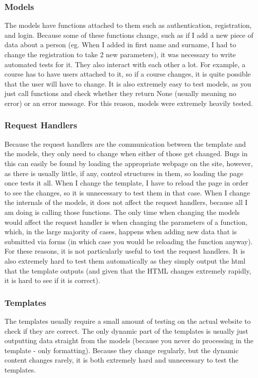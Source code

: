 \subsubsection{Models}
The models have functions attached to them such as authentication, registration, and login. Because some of these functions change, such as if I add a new piece of data about a person (eg. When I added in first name and surname, I had to change the registration to take 2 new parameters), it was necessary to write automated tests for it. They also interact with each other a lot. For example, a course has to have users attached to it, so if a course changes, it is quite possible that the user will have to change. It is also extremely easy to test models, as you just call functions and check whether they return None (usually meaning no error) or an error message. For this reason, models were extremely heavily tested.

\subsubsection{Request Handlers}
Because the request handlers are the communication between the template and the models, they only need to change when either of those get changed. Bugs in this can easily be found by loading the appropriate webpage on the site, however, as there is usually little, if any, control structures in them, so loading the page once tests it all. When I change the template, I have to reload the page in order to see the changes, so it is unnecessary to test them in that case. When I change the internals of the models, it does not affect the request handlers, because all I am doing is calling those functions. The only time when changing the models would affect the request handler is when changing the parameters of a function, which, in the large majority of cases, happens when adding new data that is submitted via forms (in which case you would be reloading the function anyway). For these reasons, it is not particularly useful to test the request handlers. It is also extremely hard to test them automatically as they simply output the html that the template outputs (and given that the HTML changes extremely rapidly, it is hard to see if it is correct).

\subsubsection{Templates}
The templates usually require a small amount of testing on the actual website to check if they are correct. The only dynamic part of the templates is usually just outputting data straight from the models (because you never do processing in the template - only formatting). Because they change regularly, but the dynamic content changes rarely, it is both extremely hard and unnecessary to test the templates.

